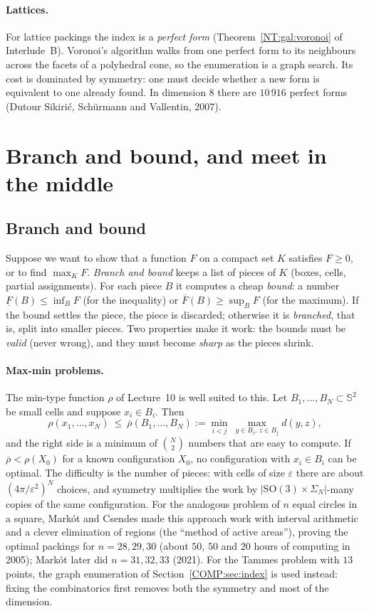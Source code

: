 \documentclass[11pt,openany]{book}
\theoremstyle{plain}
\theoremstyle{definition}
\theoremstyle{remark}
\newcommand{\Sph}{\mathbb{S}}          %
\newcommand{\SO}{\mathrm{SO}}
\newcommand{\abs}[1]{\left\lvert #1 \right\rvert}
\begin{document}
\paragraph{Lattices.} For lattice packings the index is a \emph{perfect form}
(Theorem~\ref{NT:gal:voronoi} of Interlude~B). Voronoi's algorithm walks from one perfect form to its
neighbours across the facets of a polyhedral cone, so the enumeration is a graph search. Its cost is
dominated by symmetry: one must decide whether a new form is equivalent to one already found. In
dimension $8$ there are $10\,916$ perfect forms (Dutour Sikiri\'c, Sch\"urmann and Vallentin, 2007).

\section{Branch and bound, and meet in the middle}
\label{COMP:sec:bb}

\subsection{Branch and bound}
Suppose we want to show that a function $F$ on a compact set $K$ satisfies $F\ge0$, or to find
$\max_KF$. \emph{Branch and bound} keeps a list of pieces of $K$ (boxes, cells, partial assignments).
For each piece $B$ it computes a cheap \emph{bound}: a number $\underline F(B)\le\inf_BF$ (for the
inequality) or $\overline F(B)\ge\sup_BF$ (for the maximum). If the bound settles the piece, the
piece is discarded; otherwise it is \emph{branched}, that is, split into smaller pieces. Two
properties make it work: the bounds must be \emph{valid} (never wrong), and they must become
\emph{sharp} as the pieces shrink.

\paragraph{Max-min problems.} The min-type function $\rho$ of Lecture~10 is well suited to this. Let
$B_1,\dots,B_N\subset\Sph^2$ be small cells and suppose $x_i\in B_i$. Then
\[
  \rho(x_1,\dots,x_N)\ \le\ \overline\rho(B_1,\dots,B_N):=\min_{i<j}\ \max_{y\in B_i,\,z\in B_j}d(y,z),
\]
and the right side is a minimum of $\binom N2$ numbers that are easy to compute. If
$\overline\rho<\rho(X_0)$ for a known configuration $X_0$, no configuration with $x_i\in B_i$ can be
optimal. The difficulty is the number of pieces: with cells of size $\varepsilon$ there are about
$(4\pi/\varepsilon^2)^N$ choices, and symmetry multiplies the work by $\abs{\SO(3)\times\Sigma_N}$-many
copies of the same configuration. For the analogous problem of $n$ equal circles in a square,
Mark\'ot and Csendes made this approach work with interval arithmetic and a clever elimination of
regions (the ``method of active areas''), proving the optimal packings for $n=28,29,30$
(about $50$, $50$ and $20$ hours of computing in 2005); Mark\'ot later did $n=31,32,33$ (2021). For
the Tammes problem with $13$ points, the graph enumeration of Section~\ref{COMP:sec:index} is used
instead: fixing the combinatorics first removes both the symmetry and most of the dimension.
\end{document}
